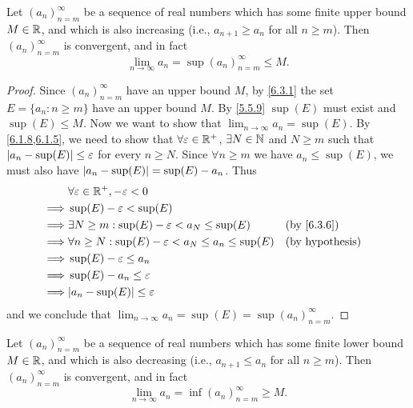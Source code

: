 \begin{prop}\label{6.3.8}
  Let \((a_n)_{n = m}^\infty\) be a sequence of real numbers which has some finite upper bound \(M \in \mathbb{R}\), and which is also increasing (i.e., \(a_{n + 1} \geq a_n\) for all \(n \geq m\)).
  Then \((a_n)_{n = m}^\infty\) is convergent, and in fact
  \[
    \lim_{n \to \infty} a_n = \sup(a_n)_{n = m}^\infty \leq M.
  \]
\end{prop}

\begin{proof}
  Since \((a_n)_{n = m}^\infty\) have an upper bound \(M\), by \cref{6.3.1} the set \(E = \{a_n : n \geq m\}\) have an upper bound \(M\).
  By \cref{5.5.9} \(\sup(E)\) must exist and \(\sup(E) \leq M\).
  Now we want to show that \(\lim_{n \to \infty} a_n = \sup(E)\).
  By \cref{6.1.8,6.1.5}, we need to show that \(\forall \varepsilon \in \mathbb{R}^+\), \(\exists N \in \mathbb{N}\) and \(N \geq m\) such that \(\left\lvert a_n - \sup(E)\right\rvert \leq \varepsilon\) for every \(n \geq N\).
  Since \(\forall n \geq m\) we have \(a_n \leq \sup(E)\), we must also have \(\left\lvert a_n - \sup(E)\right\rvert = \sup(E) - a_n\).
  Thus
  \begin{align*}
             & \forall \varepsilon \in \R^+, -\varepsilon < 0                                                   \\
    \implies & \sup(E) - \varepsilon < \sup(E)                                                                  \\
    \implies & \exists N \geq m : \sup(E) - \varepsilon < a_N \leq \sup(E)          &  & \by{6.3.6}             \\
    \implies & \forall n \geq N : \sup(E) - \varepsilon < a_N \leq a_n \leq \sup(E) &  & \text{(by hypothesis)} \\
    \implies & \sup(E) - \varepsilon \leq a_n                                                                   \\
    \implies & \sup(E) - a_n \leq \varepsilon                                                                   \\
    \implies & \abs{a_n - \sup(E)} \leq \varepsilon
  \end{align*}
  and we conclude that \(\lim_{n \to \infty} a_n = \sup(E) = \sup(a_n)_{n = m}^\infty\).
\end{proof}

\begin{ac}\label{ac:6.3.1}
  Let \((a_n)_{n = m}^\infty\) be a sequence of real numbers which has some finite lower bound \(M \in \mathbb{R}\), and which is also decreasing (i.e., \(a_{n + 1} \leq a_n\) for all \(n \geq m\)).
  Then \((a_n)_{n = m}^\infty\) is convergent, and in fact
  \[
    \lim_{n \to \infty} a_n = \inf(a_n)_{n = m}^\infty \geq M.
  \]
\end{ac}

